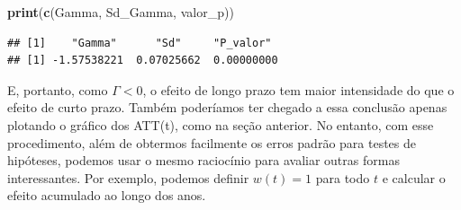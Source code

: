 \documentclass[portugues]{article}
\newenvironment{Shaded}{\begin{snugshade}}{\end{snugshade}}
\newcommand{\AttributeTok}[1]{\textcolor[rgb]{0.13,0.29,0.53}{#1}}
\newcommand{\CommentTok}[1]{\textcolor[rgb]{0.56,0.35,0.01}{\textit{#1}}}
\newcommand{\ConstantTok}[1]{\textcolor[rgb]{0.56,0.35,0.01}{#1}}
\newcommand{\DecValTok}[1]{\textcolor[rgb]{0.00,0.00,0.81}{#1}}
\newcommand{\FunctionTok}[1]{\textcolor[rgb]{0.13,0.29,0.53}{\textbf{#1}}}
\newcommand{\NormalTok}[1]{#1}
\newcommand{\OtherTok}[1]{\textcolor[rgb]{0.56,0.35,0.01}{#1}}
\newcommand{\SpecialCharTok}[1]{\textcolor[rgb]{0.81,0.36,0.00}{\textbf{#1}}}
\begin{document}
\begin{boxA}
\begin{Shaded}
\end{Shaded}

\begin{Shaded}
\begin{Highlighting}[]
\FunctionTok{print}\NormalTok{(}\FunctionTok{c}\NormalTok{(Gamma, Sd\_Gamma, valor\_p))}
\end{Highlighting}
\end{Shaded}


\begin{verbatim}
## [1]    "Gamma"      "Sd"     "P_valor"
## [1] -1.57538221  0.07025662  0.00000000
\end{verbatim}

E, portanto, como $\Gamma < 0$, o efeito de longo prazo tem maior intensidade do que o efeito de curto prazo. Também poderíamos ter chegado a essa conclusão apenas plotando o gráfico dos ATT(t), como na seção anterior. No entanto, com esse procedimento, além de obtermos facilmente os erros padrão para testes de hipóteses, podemos usar o mesmo raciocínio para avaliar outras formas interessantes. Por exemplo, podemos definir $w(t) = 1$ para todo $t$ e calcular o efeito acumulado ao longo dos anos.
    
\end{boxA}
\end{document}
